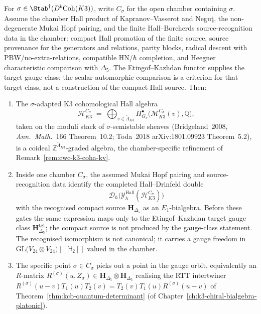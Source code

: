\begin{theorem}
\label{thm:cwc-chamber-coha-drinfeld}
For $\sigma\in\Stab^\dagger(D^b\mathrm{Coh}(K3))$, write $C_\sigma$ for the
open chamber containing $\sigma$. Assume the chamber Hall product of
Kapranov--Vasserot and Negu\c{t}, the non-degenerate Mukai Hopf pairing,
and the finite Hall--Borcherds source-recognition data in the chamber:
compact Hall promotion of the finite source, source provenance for the
generators and relations, parity blocks, radical descent with
PBW/no-extra-relations, compatible HN/$\hbar$ completion, and Heegner
characteristic comparison with $\Delta_5$. The Etingof--Kazhdan functor
supplies the target gauge class; the scalar automorphic comparison is a
criterion for that target class, not a construction of the compact Hall source.
Then:
\begin{enumerate}[label=\textup{(\roman*)}]
\item The $\sigma$-adapted K3 cohomological Hall algebra
\[
 \mathcal{H}^{C_\sigma}_{K3}
 \;=\;
 \bigoplus_{v\in\widetilde{\Lambda}_{K3}}
 H^\bullet_{G_v}\bigl(\mathcal{M}^{C_\sigma}_{K3}(v),\mathbb{Q}\bigr),
\]
taken on the moduli stack of $\sigma$-semistable sheaves
(Bridgeland~2008, \emph{Ann.\ Math.}~166 Theorem~10.2;
Toda~2018 \textup{arXiv:1801.09923} Theorem~5.2), is a coideal
$\mathbb{Z}^{\widetilde{\Lambda}_{K3}}$-graded algebra, the
chamber-specific refinement of
Remark~\ref{rem:cwc-k3-coha-kv}.
\item Inside one chamber $C_\sigma$, the assumed Mukai Hopf pairing and
source-recognition data identify the completed Hall--Drinfeld double
\[
 \mathcal{D}_\hbar\bigl(\mathcal{Y}^{\mathrm{Hall}}_\hbar(\mathcal{H}^{C_\sigma}_{K3})\bigr)
\]
with the recognised compact source $\mathbf{H}_{\Delta_5}$ as an
$E_1$-bialgebra. Before these gates the same expression maps only to
the Etingof--Kazhdan target gauge class
$\mathbf{H}_{\Delta_5}^{\mathrm{tgt}}$; the compact source is not
produced by the gauge-class statement. The recognised isomorphism is not
canonical; it carries a gauge freedom in
$\mathrm{GL}\bigl(V_{24}\otimes V_{24}\bigr)[[\mathbb{H}_2]]$
valued in the chamber.
\item The specific point $\sigma\in C_\sigma$ picks out a point in the
gauge orbit, equivalently an $R$-matrix
$R^{(\sigma)}(u,Z_\sigma)\in\mathbf{H}_{\Delta_5}\otimes
\mathbf{H}_{\Delta_5}$ realising the RTT intertwiner
$R^{(\sigma)}(u-v)T_1(u)T_2(v)=T_2(v)T_1(u)R^{(\sigma)}(u-v)$ of
Theorem~\ref{thm:kcb-quantum-determinant} (of
Chapter~\ref{ch:k3-chiral-bialgebra-platonic}).
\end{enumerate}
\end{theorem}

